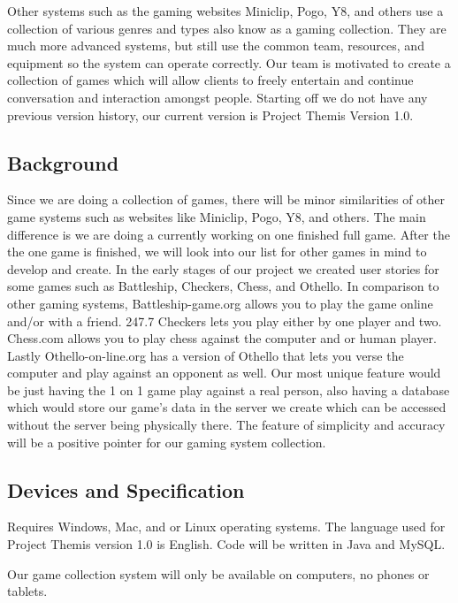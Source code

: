 \documentclass[11pt,a4paper]{article}
\begin{document}
Other systems such as the gaming websites Miniclip, Pogo, Y8, and others use a collection of various genres and types also know as a gaming collection. They are much more advanced systems, but still use the common team, resources, and equipment so the system can operate correctly. Our team is motivated to create a collection of games which will allow clients to freely entertain and continue conversation and interaction amongst people. Starting off we do not have any previous version history, our current version is Project Themis Version 1.0.

\subsection{Background}
Since we are doing a collection of games, there will be minor similarities of other game systems such as websites like Miniclip, Pogo, Y8, and others. The main difference is we are doing a currently working on one finished full game. After the the one game is finished, we will look into our list for other games in mind to develop and create. In the early stages of our project we created user stories for some games such as Battleship, Checkers, Chess, and Othello. In comparison to other gaming systems, Battleship-game.org allows you to play the game online and/or with a friend. 247.7 Checkers lets you play either by one player and two. Chess.com allows you to play chess against the computer and or human player. Lastly Othello-on-line.org has a version of Othello that lets you verse the computer and play against an opponent as well. Our most unique feature would be just having the 1 on 1 game play against a real person, also having a database which would store our game's data in the server we create which can be accessed without the server being  physically there. The feature of simplicity and accuracy will be a positive pointer for our gaming system collection.

\subsection{Devices and Specification}
Requires Windows, Mac, and or Linux operating systems. The language used for Project Themis version 1.0 is English. Code will be written in Java and MySQL.

 Our game collection system will only be available on computers, no phones or tablets. 
\end{document}
